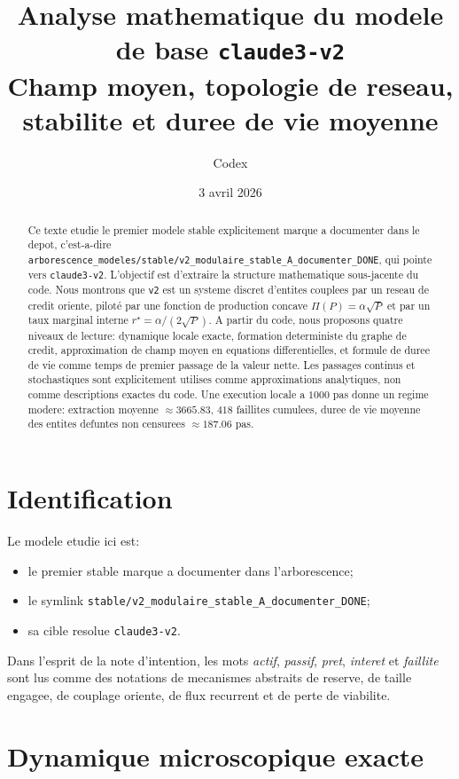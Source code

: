 \documentclass[11pt,a4paper]{article}
\title{Analyse mathematique du modele de base \texttt{claude3-v2}\\
\large Champ moyen, topologie de reseau, stabilite et duree de vie moyenne}
\author{Codex}
\date{3 avril 2026}
\begin{document}
\maketitle

\begin{abstract}
Ce texte etudie le premier modele stable explicitement marque a documenter dans le depot, c'est-a-dire \texttt{arborescence\_modeles/stable/v2\_modulaire\_stable\_A\_documenter\_DONE}, qui pointe vers \texttt{claude3-v2}. L'objectif est d'extraire la structure mathematique sous-jacente du code. Nous montrons que \texttt{v2} est un systeme discret d'entites couplees par un reseau de credit oriente, piloté par une fonction de production concave $\Pi(P)=\alpha\sqrt{P}$ et par un taux marginal interne $r^\star=\alpha/(2\sqrt{P})$. A partir du code, nous proposons quatre niveaux de lecture: dynamique locale exacte, formation deterministe du graphe de credit, approximation de champ moyen en equations differentielles, et formule de duree de vie comme temps de premier passage de la valeur nette. Les passages continus et stochastiques sont explicitement utilises comme approximations analytiques, non comme descriptions exactes du code. Une execution locale a $1000$ pas donne un regime modere: extraction moyenne $\approx 3665.83$, $418$ faillites cumulees, duree de vie moyenne des entites defuntes non censurees $\approx 187.06$ pas.
\end{abstract}

\section{Identification}
Le modele etudie ici est:
\begin{itemize}
\item le premier stable marque a documenter dans l'arborescence;
\item le symlink \texttt{stable/v2\_modulaire\_stable\_A\_documenter\_DONE};
\item sa cible resolue \texttt{claude3-v2}.
\end{itemize}

Dans l'esprit de la note d'intention, les mots \emph{actif}, \emph{passif}, \emph{pret}, \emph{interet} et \emph{faillite} sont lus comme des notations de mecanismes abstraits de reserve, de taille engagee, de couplage oriente, de flux recurrent et de perte de viabilite.

\section{Dynamique microscopique exacte}
\end{document}
